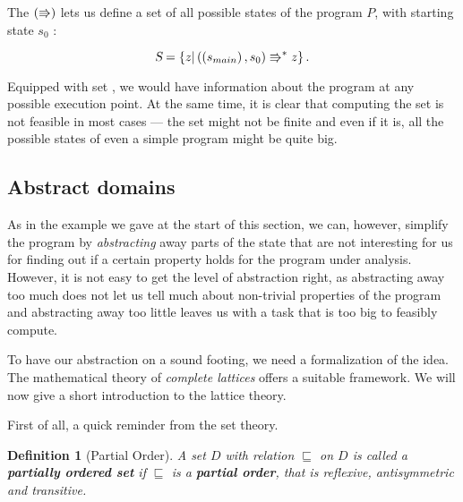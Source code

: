 \documentclass[..thesis.tex]{subfiles}
\newtheorem{defin}{Definition}[section]
\begin{document}
The $\left( \Rrightarrow \right)$ lets us define a set of all possible states of the program $P$, with starting state $s_0$ :

\begin{equation*}
\textsl{S} = \left\lbrace  z | \left( \left( s_{main} \right), s_0 \right) \Rrightarrow^{\ast} z \right\rbrace \text{.}
\end{equation*}



Equipped with set \allstates, we would have information about the program at any possible execution point. At the same time,
 it is clear that computing the set \allstates is not feasible in most cases --- the set might not be finite and even if it is,
 all the possible states of even a simple program might be quite big.

\subsection{Abstract domains}

As in the example we gave at the start of this section, we can, however, simplify the program by \textit{abstracting} away parts
of the state that are not interesting for us for finding out if a certain property holds for the program under analysis. 
However, it is not easy to get the level of abstraction right, as abstracting away too much does not let us tell much about non-trivial properties
of the program and abstracting away too little leaves us with a task that is too big to feasibly compute.


To have our abstraction on a sound footing, we need a formalization of the idea.
The mathematical theory of \textit{complete lattices} offers a suitable framework.
We will now give a short introduction to the lattice theory.


First of all, a quick reminder from the set theory.

\begin{defin}[Partial Order]
A set $D$ with relation $\sqsubseteq$ on $D$ is called a \textbf{partially ordered set} if $\sqsubseteq$ 
is a \textbf{partial order}, that is reflexive, antisymmetric and transitive.
\end{defin}
\end{document}
